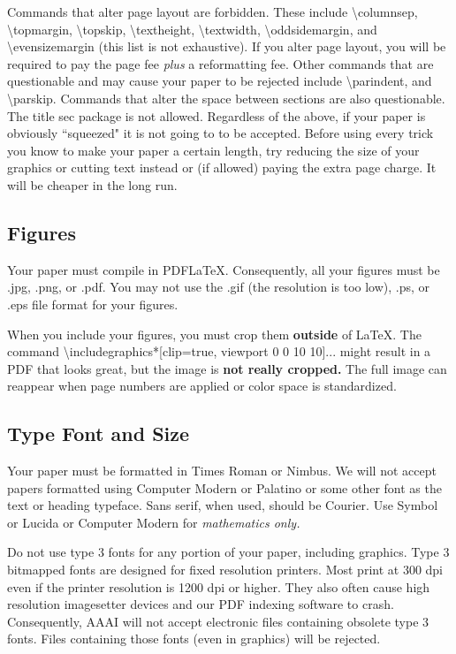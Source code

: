 \documentclass[letterpaper]{article}
\begin{document}
Commands that alter page layout are forbidden. These include \textbackslash columnsep, \textbackslash topmargin, \textbackslash topskip, \textbackslash textheight, \textbackslash textwidth, \textbackslash oddsidemargin, and \textbackslash evensizemargin (this list is not exhaustive). If you alter page layout, you will be required to pay the page fee \textit{plus} a reformatting fee. Other commands that are questionable and may cause your paper to be rejected include  \textbackslash parindent, and \textbackslash parskip. Commands that alter the space between sections are also questionable. The title sec package is not allowed. Regardless of the above, if your paper is obviously ``squeezed" it is not going to to be accepted. Before using every trick you know to make your paper a certain length, try reducing the size of your graphics or cutting text instead or (if allowed) paying the extra page charge. It will be cheaper in the long run.

\subsection{Figures}
Your paper must compile in PDF\LaTeX{}. Consequently, all your figures must be .jpg, .png, or .pdf. You may not use the .gif (the resolution is too low), .ps, or .eps file format for your figures.

When you include your figures, you must crop them \textbf{outside} of \LaTeX{}. The command \textbackslash includegraphics*[clip=true, viewport 0 0 10 10]{...} might result in a PDF that looks great, but the image is \textbf{not really cropped.} The full image can reappear when page numbers are applied or color space is standardized. 

\subsection{Type Font and Size}
Your paper must be formatted in Times Roman or Nimbus. We will not accept papers formatted using Computer Modern or Palatino or some other font as the text or heading typeface. Sans serif, when used, should be Courier. Use Symbol or Lucida or Computer Modern for \textit{mathematics only. } 

Do not use type 3 fonts for any portion of your paper, including graphics. Type 3 bitmapped fonts are designed for fixed resolution printers. Most print at 300 dpi even if the printer resolution is 1200 dpi or higher. They also often cause high resolution imagesetter devices and our PDF indexing software to crash. Consequently, AAAI will not accept electronic files containing obsolete type 3 fonts. Files containing those fonts (even in graphics) will be rejected. 
\end{document}
